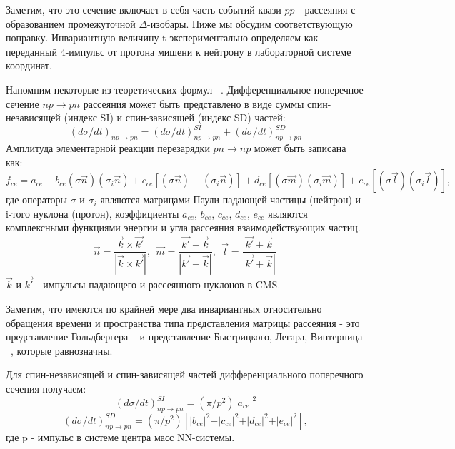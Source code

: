 \documentclass[a4paper,12pt]{article}
\begin{document}
Заметим, что это сечение включает в себя часть событий квази $pp$ -
рассеяния с образованием промежуточной $\Delta$-изобары. Ниже мы
обсудим соответствующую поправку. Инвариантную величину t
экспериментально определяем как переданный $4$-импульс от протона
мишени к нейтрону в лабораторной системе координат.

Напомним некоторые из теоретических формул
~\cite{a8,a9}. Дифференциальное поперечное сечение $np\to pn$
рассеяния может быть представлено в виде суммы спин-независящей
(индекс SI) и спин-зависящей (индекс SD) частей:
\begin{displaymath}
  (d\sigma/dt)_{np\rightarrow pn}=(d \sigma /dt)^{SI}_{np\rightarrow
    pn} + (d \sigma /dt)^{SD}_{np\rightarrow pn}
\end{displaymath}
Амплитуда элементарной реакции перезарядки $pn \to np$ может быть
записана как:
\begin{displaymath}
  f_{ce}=a_{ce}+b_{ce} (\sigma \vec{n})( \sigma _{i}\vec{n})
  +c_{ce}[(\sigma \vec{n})+( \sigma _{i} \vec{n})]+d_{ce} [(\sigma
    \vec{m})( \sigma _{i}\vec{m})]+e_{ce} [(\sigma \vec{l})( \sigma
    _{i}\vec{l})],
\end{displaymath}
где операторы $\sigma $ и $\sigma _i$ являются матрицами Паули
падающей частицы (нейтрон) и i-того нуклона (протон), коэффициенты
$a_{ce}$, $b_{ce}$, $c_{ce}$, $d_{ce}$, $e_{ce}$ являются комплексными
функциями энергии и угла рассеяния взаимодействующих частиц.
\begin{displaymath}
  \vec{n}=\frac{\vec{k}\times\vec{k'}}{|\vec{k}\times\vec{k'}|},~~
  \vec {m}=\frac{\vec{k'}-\vec{k}}{|\vec{k'}-\vec{k}|},~~
  \vec{l}=\frac{\vec{k'}+\vec{k}}{|\vec{k'}+\vec{k}|}\,
\end{displaymath}
$ \vec{k}$ и $\vec{k'}$ - импульсы падающего и рассеянного нуклонов в
CMS.

Заметим, что имеются по крайней мере два инвариантных относительно
обращения времени и пространства типа представления матрицы рассеяния
- это представление Гольдбергера ~\cite{a10} и представление
Быстрицкого, Легара, Винтерница ~\cite{a11}, которые равнозначны.

Для спин-независящей и спин-зависящей частей дифференциального
поперечного сечения получаем:
\begin{displaymath}
  (d \sigma /dt)^{SI}_{np\rightarrow pn} = (\pi /p^{2}){\vert
  }a_{ce}{\vert }^{2}
\end{displaymath}
\begin{displaymath}
  (d \sigma /dt)^{SD}_{np\rightarrow pn} =(\pi/p^{2})[ \vert b_{ce}
    \vert ^{2}+ \vert c_{ce} \vert ^{2}+ \vert d_{ce} \vert ^{2}+ \vert
    e_{ce} \vert ^{2}],
\end{displaymath}
где p - импульс в системе центра масс NN-системы.
\end{document}
